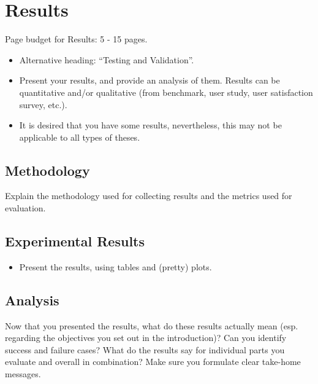 
\chapter{Results}
\label{ch:eval}
Page budget for Results: 5 - 15 pages.

\begin{itemize}
\item Alternative heading: ``Testing and Validation''.
\item Present your results, and provide an analysis of them. Results can be quantitative and/or qualitative (from benchmark, user study, user satisfaction survey, etc.).
\item It is desired that you have some results, nevertheless, this may not be applicable to all types of theses.
\end{itemize}

\section{Methodology}
Explain the methodology used for collecting results and the metrics used for evaluation.

\section{Experimental Results}
\begin{itemize}
    \item Present the results, using tables and (pretty) plots.
\end{itemize}

\section{Analysis}
Now that you presented the results, what do these results actually mean (esp. regarding the objectives you set out in the introduction)? Can you identify success and failure cases? What do the results say for individual parts you evaluate and overall in combination? Make sure you formulate clear take-home messages.

